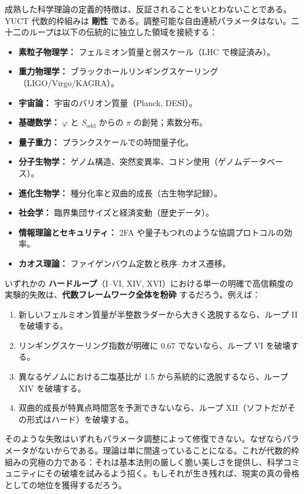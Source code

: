 \documentclass[12pt,a4paper]{article}
\begin{document}
	成熟した科学理論の定義的特徴は、反証されることをいとわないことである。YUCT 代数的枠組みは \textbf{剛性} である。調整可能な自由連続パラメータはない。二十二のループは以下の伝統的に独立した領域を接続する：
	\begin{itemize}
		\item \textbf{素粒子物理学：} フェルミオン質量と弱スケール（LHC で検証済み）。
		\item \textbf{重力物理学：} ブラックホールリンギングスケーリング（LIGO/Virgo/KAGRA）。
		\item \textbf{宇宙論：} 宇宙のバリオン質量（Planck, DESI）。
		\item \textbf{基礎数学：} \(\varphi\) と \(S_{\mathrm{odd}}\) からの \(\pi\) の創発；素数分布。
		\item \textbf{量子重力：} プランクスケールでの時間量子化。
		\item \textbf{分子生物学：} ゲノム構造、突然変異率、コドン使用（ゲノムデータベース）。
		\item \textbf{進化生物学：} 種分化率と双曲的成長（古生物学記録）。
		\item \textbf{社会学：} 臨界集団サイズと経済変動（歴史データ）。
		\item \textbf{情報理論とセキュリティ：} 2FA や量子もつれのような協調プロトコルの効率。
		\item \textbf{カオス理論：} ファイゲンバウム定数と秩序–カオス遷移。
	\end{itemize}
	いずれかの \textbf{ハードループ}（I–VI, XIV, XVI）における単一の明確で高信頼度の実験的失敗は、\textbf{代数フレームワーク全体を粉砕} するだろう。例えば：
	\begin{enumerate}
		\item 新しいフェルミオン質量が半整数ラダーから大きく逸脱するなら、ループ II を破壊する。
		\item リンギングスケーリング指数が明確に \(0.67\) でないなら、ループ VI を破壊する。
		\item 異なるゲノムにおける二塩基比が 1.5 から系統的に逸脱するなら、ループ XIV を破壊する。
		\item 双曲的成長が特異点時間窓を予測できないなら、ループ XII（ソフトだがその形式はハード）を破壊する。
	\end{enumerate}
	そのような失敗はいずれもパラメータ調整によって修復できない。なぜならパラメータがないからである。理論は単に間違っていることになる。これが代数的枠組みの究極の力である：それは基本法則の厳しく脆い美しさを提供し、科学コミュニティにその破壊を試みるよう招く。もしそれが生き残れば、現実の真の骨格としての地位を獲得するだろう。
	
\end{document}
